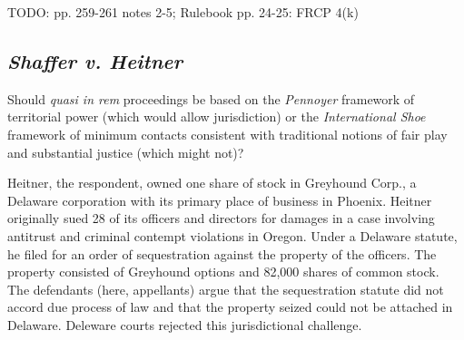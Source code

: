 TODO: pp. 259-261 notes 2-5; Rulebook pp. 24-25: FRCP 4(k)

\subsection{\emph{Shaffer v. Heitner}}

Should \emph{quasi in rem} proceedings be based on the \emph{Pennoyer}
framework of territorial power (which would allow jurisdiction) or the
\emph{International Shoe} framework of minimum contacts consistent with
traditional notions of fair play and substantial justice (which might
not)?

Heitner, the respondent, owned one share of stock in Greyhound Corp., a
Delaware corporation with its primary place of business in Phoenix.
Heitner originally sued 28 of its officers and directors for damages in
a case involving antitrust and criminal contempt violations in Oregon.
Under a Delaware statute, he filed for an order of sequestration against
the property of the officers. The property consisted of Greyhound
options and 82,000 shares of common stock. The defendants (here,
appellants) argue that the sequestration statute did not accord due
process of law and that the property seized could not be attached in
Delaware. Deleware courts rejected this jurisdictional challenge.

